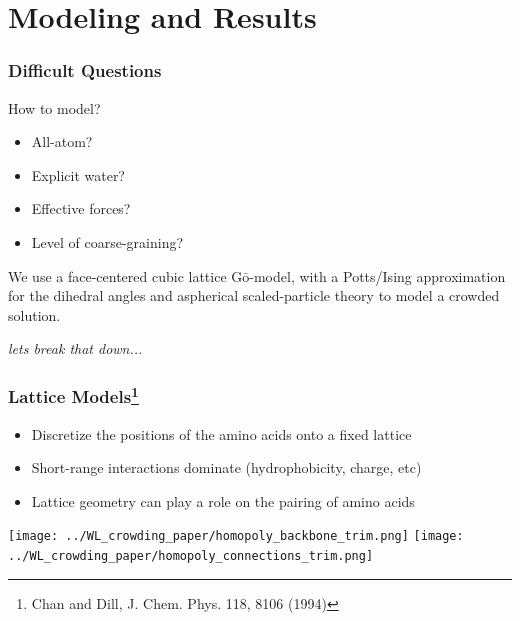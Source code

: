 \documentclass[handout]{beamer} %
\newcommand{\Go}{\text{G}\bar{\text{o}}}
\begin{document}

\section{Modeling and Results}

\begin{frame}
\frametitle{Difficult Questions}
\begin{block}
{How to model?}
\begin{itemize}
\item All-atom? 
\item Explicit water?
\item Effective forces?
\item Level of coarse-graining?
\end{itemize}
\end{block}

\vspace{1em}

We use a face-centered cubic lattice $\Go$-model, with a Potts/Ising approximation for the dihedral angles and aspherical scaled-particle theory to model a crowded solution. 

\vspace{1em}
\textit{lets break that down...} 
\end{frame}


\begin{frame}
\frametitle{Lattice Models\footnote{Chan and Dill, J. Chem. Phys. 118, 8106 (1994)}}

\begin{block}{}
\begin{itemize}
\item Discretize the positions of the amino acids onto a fixed lattice 
\item Short-range interactions dominate (hydrophobicity, charge, etc)
\item Lattice geometry can play a role on the pairing of amino acids
\end{itemize}
\end{block}
\vspace{1em}

\begin{center}
\texttt{[image: ../WL\_crowding\_paper/homopoly\_backbone\_trim.png]}
\texttt{[image: ../WL\_crowding\_paper/homopoly\_connections\_trim.png]}
\end{center}
\end{frame}
\end{document}
